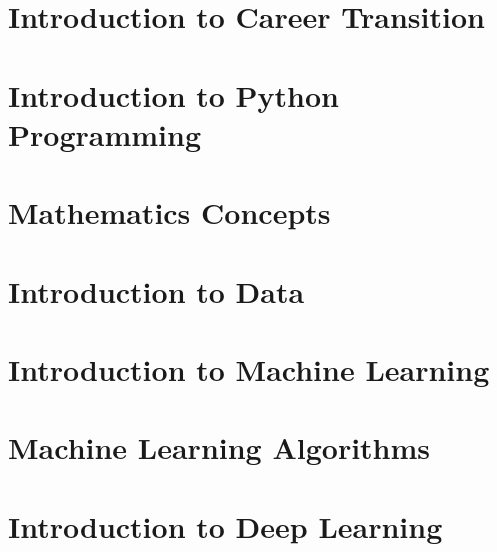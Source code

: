 \section[Intro]{Introduction to Career Transition}


\section[Python]{Introduction to Python Programming}






\section[Maths]{Mathematics Concepts}



\section[DataIntro]{Introduction to Data}





\section[MLIntro]{Introduction to Machine Learning}








\section[Algos]{Machine Learning Algorithms}











\section[DL]{Introduction to Deep Learning}



